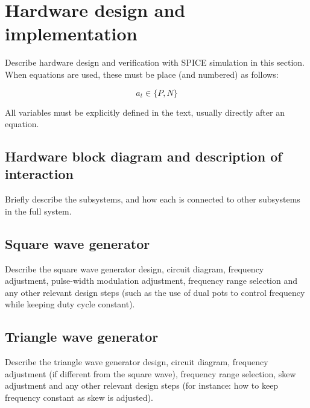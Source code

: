 \documentclass[11pt,a4paper]{article}
\begin{document}
\newpage
\section{Hardware design and implementation}
Describe hardware design and verification with SPICE simulation in this section. When equations are used, these must be place (and numbered) as follows:

\begin{equation}
a_t \in \{P,N\}
\end{equation}

All variables must be explicitly defined in the text, usually directly after an equation.

\subsection{Hardware block diagram and description of interaction}

Briefly describe the subsystems, and how each is connected to other subsystems in the full system.

\subsection{Square wave generator}

Describe the square wave generator design, circuit diagram, frequency adjustment, pulse-width modulation adjustment, frequency range selection and any other relevant design steps (such as the use of dual pots to control frequency while keeping duty cycle constant).

\subsection{Triangle wave generator}

Describe the triangle wave generator design, circuit diagram, frequency adjustment (if different from the square wave), frequency range selection, skew adjustment and any other relevant design steps (for instance: how to keep frequency constant as skew is adjusted).
\end{document}

